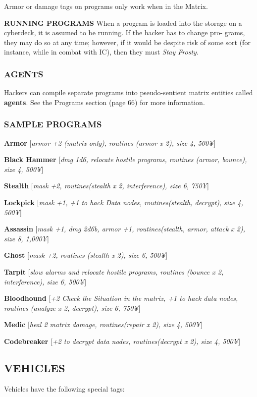 \documentclass[oneside,10pt]{article}
\begin{document}
\begin{multicols}{2}
Armor or damage tags on programs only work when in the 
Matrix. 

\textbf{RUNNING PROGRAMS 
}
When a program is loaded into the storage on a cyberdeck, 
it is assumed to be running. If the hacker has to change pro- 
grams, they may do so at any time; however, if it would be 
despite risk of some sort (for instance, while in combat with 
IC), then they must \textit{Stay Frosty}. 

\subsubsection{AGENTS}
Hackers can compile separate programs into pseudo-sentient
matrix entities called \textbf{agents}. See the Programs section (page
66) for more information.

\subsubsection{SAMPLE PROGRAMS}
\textbf{Armor} [\textit{armor +2 (matrix only), routines (armor x 2), size 4,
500¥}]

\textbf{Black Hammer} [\textit{dmg 1d6, relocate hostile programs, routines (armor, bounce), size 4, 500¥}]

\textbf{Stealth} [\textit{mask +2, routines(stealth x 2, interference), size 6,
750¥}]

\textbf{Lockpick} [\textit{mask +1, +1 to hack Data nodes, routines(stealth,
decrypt), size 4, 500¥}]

\textbf{Assassin} [\textit{mask +1, dmg 2d6b, armor +1, routines(stealth,
armor, attack x 2), size 8, 1,000¥}]

\textbf{Ghost} [\textit{mask +2, routines (stealth
  x 2), size 6, 500¥}]

\textbf{Tarpit} [\textit{slow alarms and relocate hostile programs, routines
(bounce x 2, interference), size 6, 500¥}]

\textbf{Bloodhound} [\textit{+2 Check the Situation in the matrix, +1 to
hack data nodes, routines (analyze x 2, decrypt), size 6,
750¥}]

\textbf{Medic} [\textit{heal 2 matrix damage, routines(repair x 2), size 4,
500¥}]

\textbf{Codebreaker} [\textit{+2 to decrypt data nodes, routines(decrypt x
2), size 4, 500¥}]


\subsection{VEHICLES}
Vehicles have the following special tags:


\end{multicols}
\end{document}
